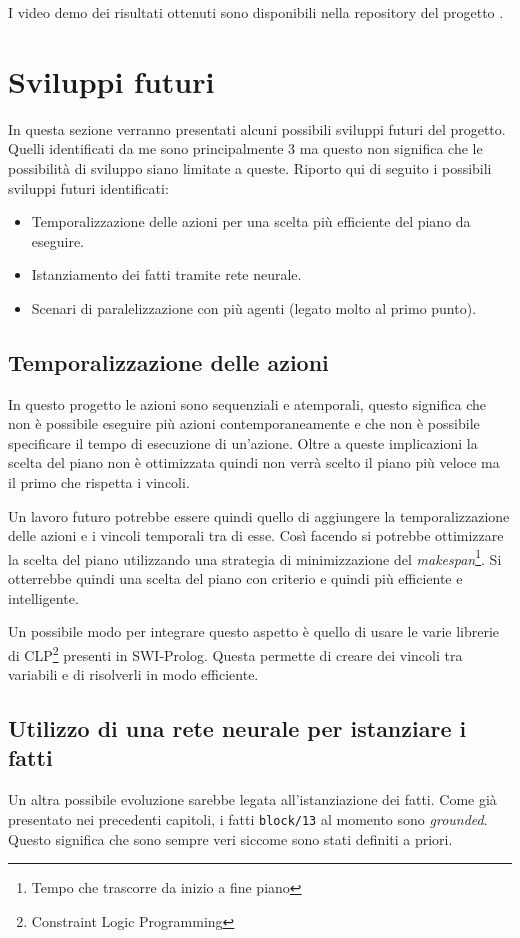 I video demo dei risultati ottenuti sono disponibili nella repository del progetto \cite{gitrepo}.
\section{Sviluppi futuri}
\label{sec:sviluppifuturi}
In questa sezione verranno presentati alcuni possibili sviluppi futuri del progetto. Quelli identificati da me sono principalmente 3 ma questo non significa che le possibilità di sviluppo siano limitate a queste. Riporto qui di seguito i possibili sviluppi futuri identificati:
\begin{itemize}
      \item Temporalizzazione delle azioni per una scelta più efficiente del piano da eseguire.
      \item Istanziamento dei fatti tramite rete neurale.
      \item Scenari di paralelizzazione con più agenti (legato molto al primo punto).
\end{itemize}

\subsection*{Temporalizzazione delle azioni}
\label{subsec:temporalizzazione}
In questo progetto le azioni sono sequenziali e atemporali, questo significa che non è possibile eseguire più azioni contemporaneamente e che non è possibile specificare il tempo di esecuzione di un'azione.
Oltre a queste implicazioni la scelta del piano non è ottimizzata quindi non verrà scelto il piano più veloce ma il primo che rispetta i vincoli.

Un lavoro futuro potrebbe essere quindi quello di aggiungere la temporalizzazione delle azioni e i vincoli temporali tra di esse. Così facendo si potrebbe ottimizzare la scelta del piano utilizzando una strategia di minimizzazione del \textit{makespan}\footnote{Tempo che trascorre da inizio a fine piano}.
Si otterrebbe quindi una scelta del piano con criterio e quindi più efficiente e intelligente. 

Un possibile modo per integrare questo aspetto è quello di usare le varie librerie di CLP\footnote{Constraint Logic Programming} presenti in SWI-Prolog. Questa permette di creare dei vincoli tra variabili e di risolverli in modo efficiente.

\subsection*{Utilizzo di una rete neurale per istanziare i fatti}
\label{subsec:neuralnet}
Un altra possibile evoluzione sarebbe legata all'istanziazione dei fatti. Come già presentato nei precedenti capitoli, i fatti \verb+block/13+ al momento sono \textit{grounded}. 
Questo significa che sono sempre veri siccome sono stati definiti a priori. 

